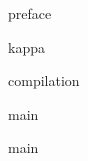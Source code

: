 \documentclass{DL}
\newcommand{\PrefacePath}{./Preface}
\newcommand{\KappaPath}{./Kappa}
\newcommand{\CompilationPath}{./Compilation}
\newcommand{\BibPath}{./Bibliography}
\newcommand{\AppendixPath}{./Appendices}
\begin{document}

\maketitle



\frontmatter

{preface}

\tableofcontents



\mainmatter

{kappa}


{compilation}

{main}

{main}

%


\backmatter
\end{document}
